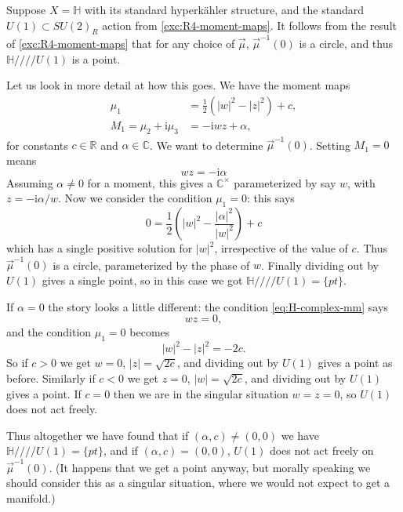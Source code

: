\documentclass[12pt,letterpaper,reqno]{article}
\numberwithin{equation}{section}
\newcommand{\R}{\ensuremath{\mathbb R}}
\newcommand{\C}{\ensuremath{\mathbb C}}
\newcommand{\bbH}{\ensuremath{\mathbb H}}
\newcommand{\half}{\ensuremath{\frac{1}{2}}}
\newcommand{\hk}{hyperk\"ahler\xspace}
\newcommand{\hkq}{/\!\!/\!\!/\!\!/}
\newcommand{\I}{{\mathrm i}}
\newcommand{\abs}[1]{\lvert#1\rvert}
\begin{document}
\begin{example}[Hyperkahler quotient of $\bbH$ by $U(1)$] \label{exa:hk-quotients-of-H}
Suppose $X = \bbH$ with its standard \hk structure, and the standard
$U(1) \subset SU(2)_R$ action from \autoref{exc:R4-moment-maps}.
It follows from the result of \autoref{exc:R4-moment-maps}
that for any choice of $\vec\mu$, $\vec\mu^{-1}(0)$ is a circle,
and thus $\bbH \hkq U(1)$ is a point.

Let us look in more detail at how this goes.
We have the moment maps
\begin{align}
  \mu_{1} &= \half (\abs{w}^2 - \abs{z}^2) + c, \\
  M_1 = \mu_{2} + \I \mu_{3} &= -\I w z + \alpha,
\end{align}
for constants $c \in \R$ and $\alpha \in \C$.
We want to determine $\vec\mu^{-1}(0)$. Setting $M_1 = 0$
means
\begin{equation} \label{eq:H-complex-mm}
 wz = - \I \alpha 
\end{equation}
Assuming $\alpha \neq 0$ for a moment,
this gives a $\C^\times$ parameterized by say $w$,
with $z = - \I \alpha / w$. Now we consider the condition
$\mu_1 = 0$: this says
\begin{equation} \label{eq:H-real-mm}
  0 = \half\left(\abs{w}^2 - \frac{\abs{\alpha}^2}{\abs{w}^2}\right) + c
\end{equation}
which has a single positive solution for $\abs{w}^2$, irrespective of
the value of $c$. Thus $\vec\mu^{-1}(0)$ is a circle, parameterized
by the phase of $w$. Finally dividing out by $U(1)$ gives a single point,
so in this case we got $\bbH \hkq U(1) = \{ pt \}$.

If $\alpha = 0$ the story looks a little different: the condition 
\eqref{eq:H-complex-mm} says 
\begin{equation}
wz = 0,
\end{equation}
and the condition $\mu_1 = 0$ becomes
\begin{equation}
  \abs{w}^2 - \abs{z}^2 = - 2c.
\end{equation}
So if $c > 0$ we get $w = 0$, $\abs{z} = \sqrt{2c}$, and dividing out by $U(1)$
gives a point as before. Similarly if $c < 0$ we get $z = 0$, $\abs{w} = \sqrt{2c}$,
and dividing out by $U(1)$
gives a point. If $c = 0$ then we are in the singular situation $w = z = 0$,
so $U(1)$ does not act freely.

Thus altogether we have found that if $(\alpha,c) \neq (0,0)$ we have
$\bbH \hkq U(1) = \{ pt \}$, and if $(\alpha,c) = (0,0)$, $U(1)$ does not
act freely on $\vec\mu^{-1}(0)$. (It happens that we get a point anyway,
but morally speaking we should consider this as a singular situation, where
we would not expect to get a manifold.)


\end{example}
\end{document}
